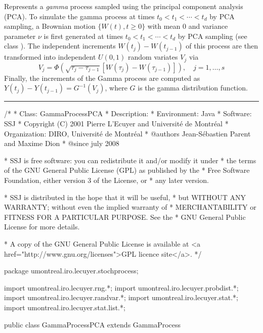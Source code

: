 
Represents a \emph{gamma} process sampled using the principal
component analysis (PCA).  To simulate the gamma process at times
$t_0 < t_1 < \cdots < t_d$ by PCA sampling, a Brownian
motion $\{ W(t), t \geq 0 \}$ with mean $0$ and variance parameter $\nu$ is
first generated at times $t_0 < t_1 < \cdots < t_d$
by PCA sampling (see class ).
The independent increments $W(t_{j}) - W(t_{j-1})$ of this process
are then transformed into independent $U(0, 1)$ random variates $V_{j}$ via
$$ V_j = \Phi\left(\sqrt{\tau_j-\tau_{j-1}} [W(\tau_j)-W(\tau_{j-1})]\right),
\quad j=1,\dots,s $$
Finally, the increments of the Gamma process are computed as
$ Y(t_{j}) - Y(t_{j-1}) = G^{-1}(V_j)$, where $G$ is the gamma distribution
 function.

\bigskip\hrule\bigskip

\begin{code}
\begin{hide}
/*
 * Class:        GammaProcessPCA
 * Description:  
 * Environment:  Java
 * Software:     SSJ 
 * Copyright (C) 2001  Pierre L'Ecuyer and Université de Montréal
 * Organization: DIRO, Université de Montréal
 * @authors      Jean-Sébastien Parent and Maxime Dion
 * @since        july 2008

 * SSJ is free software: you can redistribute it and/or modify it under
 * the terms of the GNU General Public License (GPL) as published by the
 * Free Software Foundation, either version 3 of the License, or
 * any later version.

 * SSJ is distributed in the hope that it will be useful,
 * but WITHOUT ANY WARRANTY; without even the implied warranty of
 * MERCHANTABILITY or FITNESS FOR A PARTICULAR PURPOSE.  See the
 * GNU General Public License for more details.

 * A copy of the GNU General Public License is available at
   <a href="http://www.gnu.org/licenses">GPL licence site</a>.
 */
\end{hide}
package umontreal.iro.lecuyer.stochprocess;\begin{hide}
import umontreal.iro.lecuyer.rng.*;
import umontreal.iro.lecuyer.probdist.*;
import umontreal.iro.lecuyer.randvar.*;
import umontreal.iro.lecuyer.stat.*;
import umontreal.iro.lecuyer.stat.list.*;
\end{hide}

public class GammaProcessPCA extends GammaProcess \begin{hide} {
    double[] arrayTime;
    BrownianMotionPCA BMPCA;

\end{hide}
\end{code}
